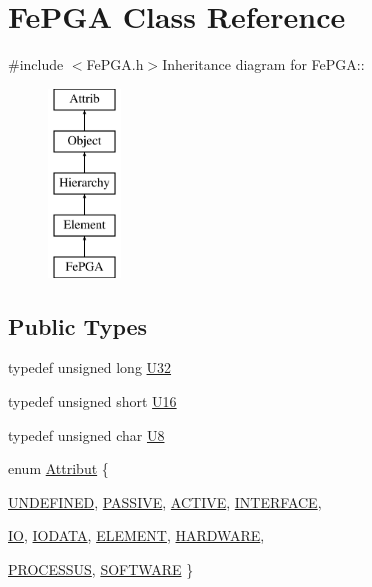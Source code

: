 \hypertarget{classFePGA}{
\section{FePGA Class Reference}
\label{classFePGA}
}


{\ttfamily \#include $<$FePGA.h$>$}Inheritance diagram for FePGA::\begin{figure}[H]
\begin{center}
\leavevmode
\includegraphics[height=5cm]{classFePGA}
\end{center}
\end{figure}
\subsection*{Public Types}
\begin{DoxyCompactItemize}
\item 
typedef unsigned long \hyperlink{classFePGA_a1d44a0b27d13179bb1dceb5ec6f4cc1f}{U32}
\item 
typedef unsigned short \hyperlink{classFePGA_ac84b20a342a6c963cba061c8bdc37651}{U16}
\item 
typedef unsigned char \hyperlink{classFePGA_ab65d84dbbc4b5711eb4d85d00c5abfa2}{U8}
\item 
enum \hyperlink{classAttrib_a69e171d7cc6417835a5a306d3c764235}{Attribut} \{ \par
\hyperlink{classAttrib_a69e171d7cc6417835a5a306d3c764235a3a8da2ab97dda18aebab196fe4100531}{UNDEFINED}, 
\hyperlink{classAttrib_a69e171d7cc6417835a5a306d3c764235a2bfb2af57b87031d190a05fe25dd92ed}{PASSIVE}, 
\hyperlink{classAttrib_a69e171d7cc6417835a5a306d3c764235a3b1fec929c0370d1436f2f06e298fb0d}{ACTIVE}, 
\hyperlink{classAttrib_a69e171d7cc6417835a5a306d3c764235aa27c16b480a369ea4d18b07b2516bbc7}{INTERFACE}, 
\par
\hyperlink{classAttrib_a69e171d7cc6417835a5a306d3c764235a1420a5b8c0540b2af210b6975eded7f9}{IO}, 
\hyperlink{classAttrib_a69e171d7cc6417835a5a306d3c764235a0af3b0d0ac323c1704e6c69cf90add28}{IODATA}, 
\hyperlink{classAttrib_a69e171d7cc6417835a5a306d3c764235a7788bc5dd333fd8ce18562b269c9dab1}{ELEMENT}, 
\hyperlink{classAttrib_a69e171d7cc6417835a5a306d3c764235a61ceb22149f365f1780d18f9d1459423}{HARDWARE}, 
\par
\hyperlink{classAttrib_a69e171d7cc6417835a5a306d3c764235a75250e29692496e73effca2c0330977f}{PROCESSUS}, 
\hyperlink{classAttrib_a69e171d7cc6417835a5a306d3c764235a103a67cd0b8f07ef478fa45d4356e27b}{SOFTWARE}
 \}
\end{DoxyCompactItemize}
